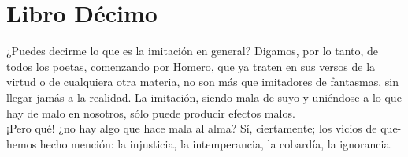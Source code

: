 \documentclass[10pt]{book}
\begin{document}
\chapter*{Libro Décimo}
¿Puedes decirme lo que es la imitación en general? 
Digamos, por lo tanto, de todos los poetas, comenzando por Homero, que ya traten en sus versos de la virtud o de cualquiera otra materia, no son más que imitadores de fantasmas, sin llegar jamás a la realidad. La imitación, siendo mala de suyo y uniéndose a lo que hay de malo en nosotros, sólo puede producir efectos malos. \\
¡Pero qué! ¿no hay algo que hace mala al alma? Sí, ciertamente; los vicios de que- hemos hecho mención: la injusticia, la intemperancia, la cobardía, la ignorancia. 
\end{document}
